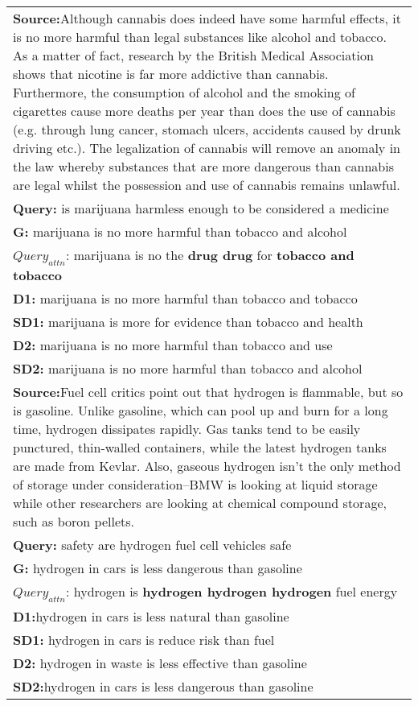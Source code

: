 \documentclass[11pt]{article}
\begin{document}
\begin{table*}[!tbh]
\begin{center}
\begin{tabular}{|p{}|}
\hline
\textbf{Source:}Although cannabis does indeed have some harmful effects, it is no more harmful than legal substances like alcohol and tobacco. As a matter of fact, research by the British Medical Association shows that nicotine is far more addictive than cannabis. Furthermore, the consumption of alcohol and the smoking of cigarettes cause more deaths per year than does the use of cannabis (e.g. through lung cancer, stomach ulcers, accidents caused by drunk driving etc.). The legalization of cannabis will remove an anomaly in the law whereby substances that are more dangerous than cannabis are legal whilst the possession and use of cannabis remains unlawful.\\
\textbf{Query:} is marijuana harmless enough to be considered a medicine\\
\textbf{G:} marijuana is no more harmful than tobacco and alcohol\\
\boldmath${Query_{attn}}$: marijuana is no the \textbf{drug drug} for \textbf{tobacco and tobacco}\\
\textbf{D1:} marijuana is no more harmful than tobacco and tobacco\\
\textbf{SD1:} marijuana is more for evidence than tobacco and health\\
\textbf{D2:} marijuana is no more harmful than tobacco and use \\
\textbf{SD2:} marijuana is no more harmful than tobacco and alcohol\\

\hline
\textbf{Source:}Fuel cell critics point out that hydrogen is flammable, but so is gasoline. Unlike gasoline, which can pool up and burn for a long time, hydrogen dissipates rapidly. Gas tanks tend to be easily punctured, thin-walled containers, while the latest hydrogen tanks are made from Kevlar. Also, gaseous hydrogen isn't the only method of storage under consideration--BMW is looking at liquid storage while other researchers are looking at chemical compound storage, such as boron pellets.\\
\textbf{Query:} safety are hydrogen fuel cell vehicles safe\\
\textbf{G:} hydrogen in cars is less dangerous than gasoline \\
\boldmath${Query_{attn}}$:  hydrogen is \textbf{hydrogen hydrogen hydrogen} fuel energy\\
\textbf{D1:}hydrogen in cars is less natural than gasoline\\
\textbf{SD1:} hydrogen in cars is reduce risk than fuel\\
\textbf{D2:} hydrogen in waste is less effective than gasoline\\
\textbf{SD2:}hydrogen in cars is less dangerous than gasoline \\


\end{tabular}
\end{center}
\end{table*}
\end{document}
